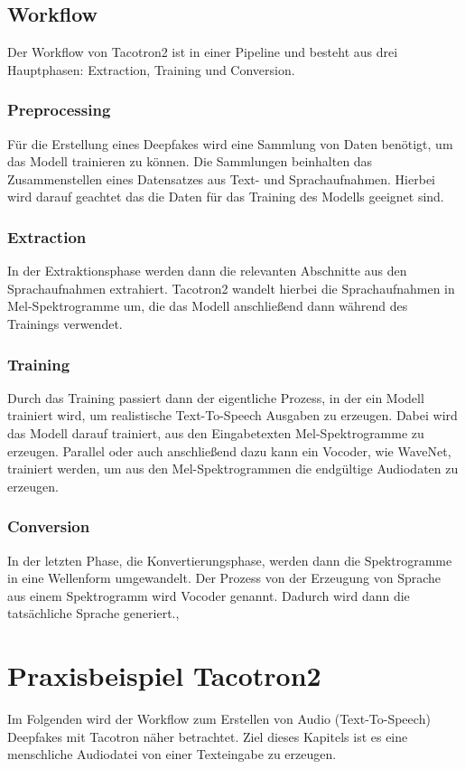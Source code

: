 \subsection{Workflow}
Der Workflow von Tacotron2 ist in einer Pipeline und besteht aus drei Hauptphasen: Extraction, Training und Conversion.
\subsubsection*{Preprocessing}
Für die Erstellung eines Deepfakes wird eine Sammlung von Daten benötigt, um das Modell trainieren zu können. Die Sammlungen beinhalten das Zusammenstellen eines Datensatzes aus Text- und Sprachaufnahmen. Hierbei wird darauf geachtet das die Daten für das Training des Modells geeignet sind.\cite{Arxiv}
\subsubsection*{Extraction}
In der Extraktionsphase werden dann die relevanten Abschnitte aus den Sprachaufnahmen extrahiert. Tacotron2 wandelt hierbei die Sprachaufnahmen in Mel-Spektrogramme um, die das Modell anschließend dann während des Trainings verwendet.\cite{Arxiv}
\subsubsection*{Training}
Durch das Training passiert dann der eigentliche Prozess, in der ein Modell trainiert wird, um realistische Text-To-Speech Ausgaben zu erzeugen. Dabei wird das Modell darauf trainiert, aus den Eingabetexten Mel-Spektrogramme zu erzeugen. Parallel oder auch anschließend dazu kann ein Vocoder, wie WaveNet, trainiert werden, um aus den Mel-Spektrogrammen die endgültige Audiodaten zu erzeugen.\cite{Arxiv}
\subsubsection*{Conversion}
In der letzten Phase, die Konvertierungsphase, werden dann die Spektrogramme in eine Wellenform umgewandelt. Der Prozess von der Erzeugung von Sprache aus einem Spektrogramm wird Vocoder genannt. Dadurch wird dann die tatsächliche Sprache generiert.\cite{Arxiv},\cite{pytorch}
\section{Praxisbeispiel Tacotron2}
Im Folgenden wird der Workflow zum Erstellen von Audio (Text-To-Speech) Deepfakes mit Tacotron näher betrachtet. Ziel dieses Kapitels ist es eine menschliche Audiodatei von einer Texteingabe zu erzeugen.
